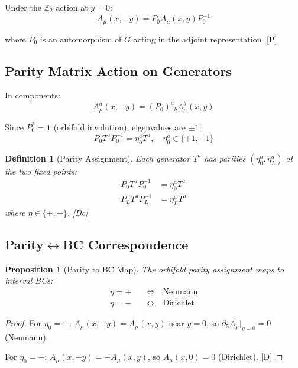 \documentclass[11pt,a4paper]{article}
\newtheorem{proposition}[theorem]{Proposition}
\newtheorem{definition}[theorem]{Definition}
\newcommand{\tagD}{\textcolor{blue!70!black}{[D]}}
\newcommand{\tagDc}{\textcolor{blue!50!black}{[Dc]}}
\newcommand{\tagP}{\textcolor{green!50!black}{[P]}}
\begin{document}
Under the $\mathbb{Z}_2$ action at $y = 0$:
\begin{equation}
\label{eq:z2-action-0}
A_\mu(x, -y) = P_0 A_\mu(x, y) P_0^{-1}
\end{equation}

where $P_0$ is an automorphism of $G$ acting in the adjoint representation. \tagP

\subsection{Parity Matrix Action on Generators}

In components:
\begin{equation}
\label{eq:parity-components}
A_\mu^a(x, -y) = (P_0)^a{}_b A_\mu^b(x, y)
\end{equation}

Since $P_0^2 = \mathbf{1}$ (orbifold involution), eigenvalues are $\pm 1$:
\begin{equation}
\label{eq:parity-eigenvalue}
P_0 T^a P_0^{-1} = \eta_0^a T^a, \quad \eta_0^a \in \{+1, -1\}
\end{equation}

\begin{definition}[Parity Assignment]
\label{def:parity}
Each generator $T^a$ has parities $(\eta_0^a, \eta_L^a)$ at the two fixed points:
\begin{align}
\label{eq:parity-0}
P_0 T^a P_0^{-1} &= \eta_0^a T^a \\
\label{eq:parity-L}
P_L T^a P_L^{-1} &= \eta_L^a T^a
\end{align}
where $\eta \in \{+, -\}$. \tagDc
\end{definition}

\subsection{Parity$\leftrightarrow$BC Correspondence}

\begin{proposition}[Parity to BC Map]
\label{prop:parity-bc}
The orbifold parity assignment maps to interval BCs:
\begin{align}
\label{eq:parity-N}
\eta = + \quad &\Leftrightarrow \quad \text{Neumann} \\
\label{eq:parity-D}
\eta = - \quad &\Leftrightarrow \quad \text{Dirichlet}
\end{align}
\end{proposition}

\begin{proof}
For $\eta_0 = +$: $A_\mu(x, -y) = A_\mu(x, y)$ near $y = 0$, so
$\partial_5 A_\mu|_{y=0} = 0$ (Neumann).

For $\eta_0 = -$: $A_\mu(x, -y) = -A_\mu(x, y)$, so $A_\mu(x, 0) = 0$ (Dirichlet). \tagD
\end{proof}
\end{document}
